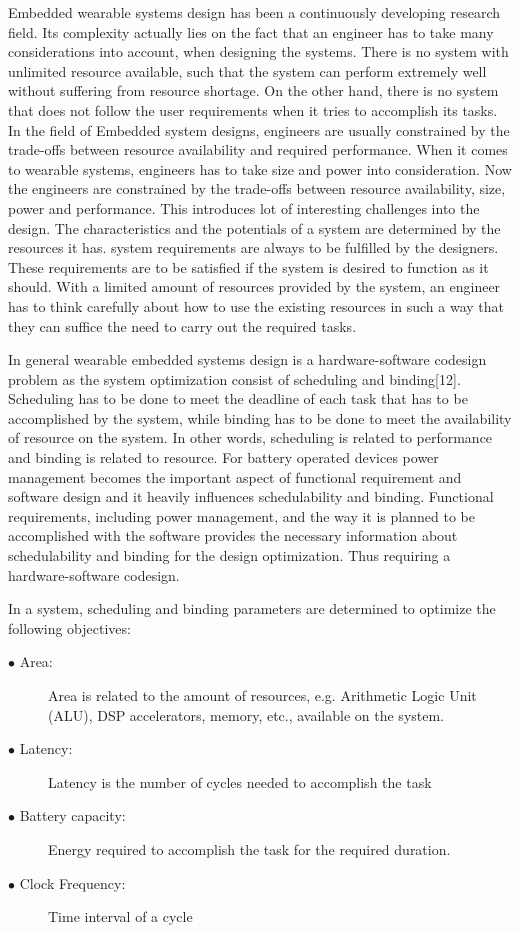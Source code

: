 \hspace{10mm}Embedded wearable systems design has been a continuously developing research field. Its complexity actually lies on the fact that an engineer has to take many considerations into account, when designing the systems. There is no system with unlimited resource available, such that the system can perform extremely well without suffering from resource shortage. On the other hand, there is no system that does not follow the user requirements when it tries to accomplish its tasks. In the field of Embedded system designs, engineers are usually constrained by the trade-offs between resource availability and required performance.  When it comes to wearable systems, engineers has to take size and power into consideration.  Now the engineers are constrained by the trade-offs between resource availability, size, power and performance. This introduces lot of interesting challenges into the design. The characteristics and the potentials of a system are determined by the resources it has. system requirements are always to be fulfilled by the designers. These requirements are to be satisfied if the system is desired to function as it should. With a 
limited amount of resources provided by the system, an engineer has to think carefully about how to use the existing resources in such a way that they can suffice the need to carry out the required tasks. 

\hspace{10mm}In general wearable embedded systems design is a hardware-software codesign problem as the system optimization consist of scheduling and binding[12]. Scheduling has to be done to meet the deadline of each task that has to be accomplished by the system, while binding has to be done to meet the availability of resource on the system. In other words, scheduling is related to performance and binding is related to resource. For  battery operated devices power management becomes the important aspect of  functional requirement and software design and it heavily influences schedulability and binding. Functional requirements, including power management, and  the way it is planned to be accomplished with the software provides the necessary information about schedulability and binding for the design optimization. Thus requiring a hardware-software codesign. 

\hspace{10mm}In a system, scheduling and binding parameters are determined to optimize the following objectives: 
\begin{description}
	\item[$\bullet$ Area:]  Area is related to the amount of resources, e.g. Arithmetic Logic Unit (ALU), DSP accelerators, memory, etc., available on the system.
	\item[$\bullet$ Latency:]  Latency is the number of cycles  needed to accomplish the task 
	\item[$\bullet$ Battery capacity:]  Energy required to accomplish the task for the required duration. 
	\item[$\bullet$ Clock Frequency:]  Time interval of a cycle 
	
\end{description} 

